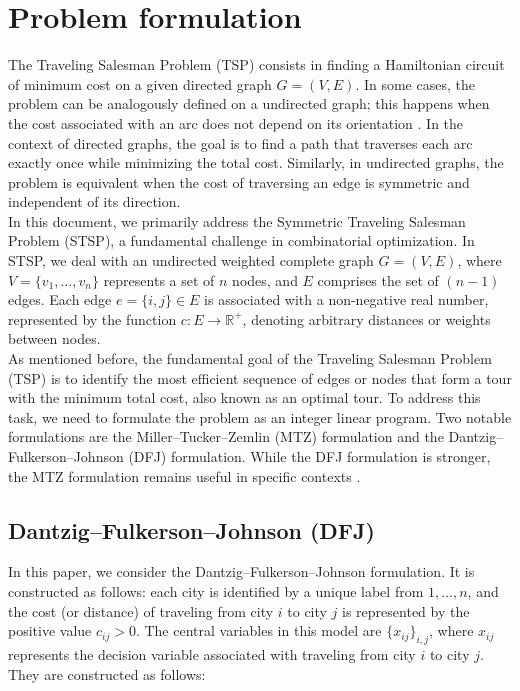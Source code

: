 \section{Problem formulation}
The Traveling Salesman Problem (TSP) consists in finding a Hamiltonian circuit of minimum cost on a given directed graph \( G = (V, E) \). In some cases, the problem can be analogously defined on a undirected graph; this happens when the cost associated with an arc does not depend on its orientation \cite{fischetti2019}. In the context of directed graphs, the goal is to find a path that traverses each arc exactly once while minimizing the total cost. Similarly, in undirected graphs, the problem is equivalent when the cost of traversing an edge is symmetric and independent of its direction. \\

\noindent In this document, we primarily address the Symmetric Traveling Salesman Problem (STSP), a fundamental challenge in combinatorial optimization. In STSP, we deal with an undirected weighted complete graph \( G = (V, E) \), where \( V = \{v_1, \ldots, v_n\} \) represents a set of \( n \) nodes, and \( E \) comprises the set of \( (n-1) \) edges. Each edge \( e = \{i, j\} \in E \) is associated with a non-negative real number, represented by the function \( c: E \rightarrow \mathbb{R}^+ \), denoting arbitrary distances or weights between nodes. \\

\noindent As mentioned before, the fundamental goal of the Traveling Salesman Problem (TSP) is to identify the most efficient sequence of edges or nodes that form a tour with the minimum total cost, also known as an optimal tour. To address this task, we need to formulate the problem as an integer linear program. Two notable formulations are the Miller--Tucker--Zemlin (MTZ) formulation and the Dantzig--Fulkerson--Johnson (DFJ) formulation. While the DFJ formulation is stronger, the MTZ formulation remains useful in specific contexts \cite{wiki:TSP}.

\newpage

\subsection{Dantzig–Fulkerson–Johnson (DFJ)}
\label{chap:DFJ}
In this paper, we consider the Dantzig–Fulkerson–Johnson formulation. It is constructed as follows: each city is identified by a unique label from \(1, \ldots, n\), and the cost (or distance) of traveling from city \(i\) to city \(j\) is represented by the positive value \(c_{ij} > 0\). The central variables in this model are \(\{x_{ij}\}_{i,j}\), where \(x_{ij}\) represents the decision variable associated with traveling from city \(i\) to city \(j\). They are constructed as follows:


